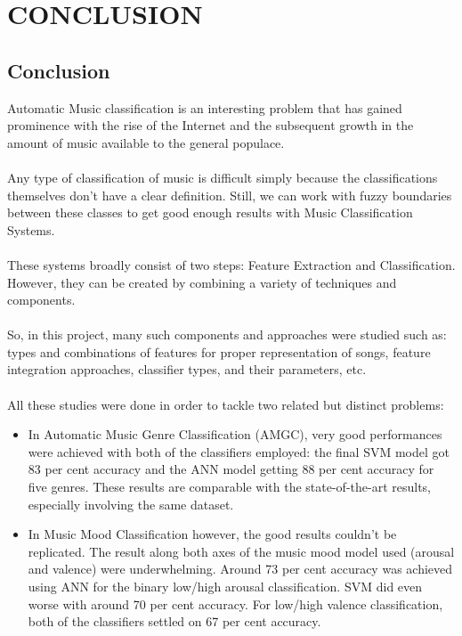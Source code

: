 \newpage

\section{CONCLUSION}
\subsection{Conclusion}
Automatic Music classification is an interesting problem that has gained prominence with the rise of the Internet and the subsequent growth in the amount of music available to the general populace.\\
\\
Any type of classification of music is difficult simply because the classifications themselves don’t have a clear definition. Still, we can work with fuzzy boundaries between these classes to get good enough results with Music Classification Systems.\\
\\
These systems broadly consist of two steps: Feature Extraction and Classification. However, they can be created by combining a variety of techniques and components.\\
\\
So, in this project, many such components and approaches were studied such as: types and combinations of features for proper representation of songs, feature integration approaches, classifier types, and their parameters, etc.\\
\\
All these studies were done in order to tackle two related but distinct problems: 
\begin{itemize}
        \item In Automatic Music Genre Classification (AMGC), very good performances were achieved with both of the classifiers employed: the final SVM model got 83 per cent accuracy and the ANN model getting 88 per cent accuracy for five genres. These results are comparable with the state-of-the-art results, especially involving the same dataset. 
        \item In Music Mood Classification however, the good results couldn’t be replicated. 
                The result along both axes of the music mood model used (arousal and valence) were underwhelming. Around 73 per cent accuracy was achieved using ANN for the binary low/high arousal classification. SVM did even worse with around 70 per cent accuracy. For low/high valence classification, both of the classifiers settled on 67 per cent accuracy.  
\end{itemize}

